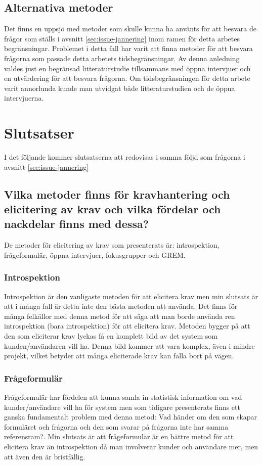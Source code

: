 \subsection{Alternativa metoder}
Det finns en uppsjö  med metoder som skulle kunna ha använts för att besvara de frågor som ställs i avsnitt \ref{sec:issue-jannering} inom ramen för detta arbetes begränsningar. Problemet i detta fall har varit att finna metoder för att besvara frågorna som passade detta arbetets tidsbegränsningar. Av denna anledning valdes just en begränsad litteraturstudie tillsammans med öppna intervjuer och en utvärdering för att besvara frågorna. Om tidsbegränsningen för detta arbete varit annorlunda kunde man utvidgat både litteraturstudien och de öppna intervjuerna.   
\section{Slutsatser}
I det följande kommer slutsatserna att redovisas i samma följd som frågorna i avsnitt \ref{sec:issue-jannering}
\label{sec:conclusions-jannering}
\subsection{Vilka metoder finns för kravhantering och elicitering av krav och vilka fördelar och nackdelar finns med dessa?}
De metoder för elicitering av krav som presenterats är: introspektion, frågeformulär, öppna intervjuer, fokusgrupper och GREM.

\subsubsection{Introspektion}
Introspektion är den vanligaste metoden för att elicitera krav men min slutsats är att i många fall är detta inte den bästa metoden att använda. Det finns för många felkällor med denna metod för att säga att man borde använda ren introspektion (bara introspektion) för att elicitera krav. Metoden bygger på att den som eliciterar krav lyckas få en komplett bild av det system som kunden/användaren vill ha. Denna bild kommer att vara komplex, även i mindre projekt, vilket betyder att många eliciterade krav kan falla bort på vägen.

\subsubsection{Frågeformulär}
Frågeformulär har fördelen att kunna samla in statistisk information om vad kunder/användare vill ha för system men som tidigare presenterats finns ett ganska fundamentalt problem med denna metod: Vad händer om den som skapar formuläret och frågorna och den som svarar på frågorna inte har samma referensram?. Min slutsats är att frågeformulär är en bättre metod för att elicitera krav än introspektion då man involverar kunder och användare mer, men att även den är bristfällig.

